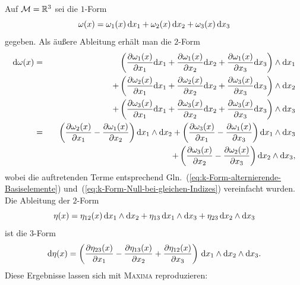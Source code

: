 \begin{example}
\label{exa:Formen-Ableitung}Auf $\mathcal{M}={\mathbb{R}}^{3}$ sei die $1$-Form
\begin{equation}
\omega(x)=\omega_{1}(x)\,{\mathrm{d}} x_{1}+\omega_{2}(x)\,{\mathrm{d}} x_{2}+\omega_{3}(x)\,{\mathrm{d}} x_{3}\label{eq:beispiel-ableitung-omega}
\end{equation}
gegeben. Als äußere Ableitung erhält man die $2$-Form
\begin{eqnarray}
{\mathrm{d}}\omega(x) & = & \phantom{+}\left(\frac{\partial\omega_{1}(x)}{\partial x_{1}}{\mathrm{d}} x_{1}+\frac{\partial\omega_{1}(x)}{\partial x_{2}}{\mathrm{d}} x_{2}+\frac{\partial\omega_{1}(x)}{\partial x_{3}}{\mathrm{d}} x_{3}\right)\wedge{\mathrm{d}} x_{1}\nonumber \\
 &  & +\left(\frac{\partial\omega_{2}(x)}{\partial x_{1}}{\mathrm{d}} x_{1}+\frac{\partial\omega_{2}(x)}{\partial x_{2}}{\mathrm{d}} x_{2}+\frac{\partial\omega_{3}(x)}{\partial x_{3}}{\mathrm{d}} x_{3}\right)\wedge{\mathrm{d}} x_{2}\nonumber \\
 &  & +\left(\frac{\partial\omega_{3}(x)}{\partial x_{1}}{\mathrm{d}} x_{1}+\frac{\partial\omega_{3}(x)}{\partial x_{2}}{\mathrm{d}} x_{2}+\frac{\partial\omega_{3}(x)}{\partial x_{3}}{\mathrm{d}} x_{3}\right)\wedge{\mathrm{d}} x_{3}\nonumber \\
 & = & \phantom{+}\left(\frac{\partial\omega_{2}(x)}{\partial x_{1}}-\frac{\partial\omega_{1}(x)}{\partial x_{2}}\right){\mathrm{d}} x_{1}\wedge{\mathrm{d}} x_{2}+\left(\frac{\partial\omega_{3}(x)}{\partial x_{1}}-\frac{\partial\omega_{1}(x)}{\partial x_{3}}\right){\mathrm{d}} x_{1}\wedge{\mathrm{d}} x_{3}\nonumber \\
 &  & +\left(\frac{\partial\omega_{3}(x)}{\partial x_{2}}-\frac{\partial\omega_{2}(x)}{\partial x_{3}}\right){\mathrm{d}} x_{2}\wedge{\mathrm{d}} x_{3},\label{eq:beispiel-ableitung-domega}
\end{eqnarray}
wobei die auftretenden Terme entsprechend Gln.~(\ref{eq:k-Form-alternierende-Basiselemente})
und~(\ref{eq:k-Form-Null-bei-gleichen-Indizes}) vereinfacht wurden.
Die Ableitung der $2$-Form 
\[
\eta(x)=\eta_{12}(x)\,{\mathrm{d}} x_{1}\wedge{\mathrm{d}} x_{2}+\eta_{13}\,{\mathrm{d}} x_{1}\wedge{\mathrm{d}} x_{3}+\eta_{23}\,{\mathrm{d}} x_{2}\wedge{\mathrm{d}} x_{3}
\]
ist die $3$-Form 
\[
{\mathrm{d}}\eta(x)=\left(\frac{\partial\eta_{23}(x)}{\partial x_{1}}-\frac{\partial\eta_{13}(x)}{\partial x_{2}}+\frac{\partial\eta_{12}(x)}{\partial x_{3}}\right)\,{\mathrm{d}} x_{1}\wedge{\mathrm{d}} x_{2}\wedge{\mathrm{d}} x_{3}.
\]
Diese Ergebnisse lassen sich mit \textsc{Maxima} reproduzieren:

\begin{maxima}\end{maxima}
\end{example}

